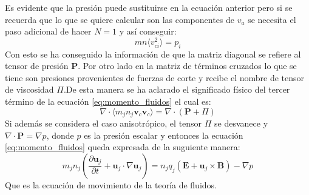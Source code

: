 \documentclass[../tesis_main_file.tex]{subfiles}
\begin{document}
Es evidente que la presión puede sustituirse en la ecuación anterior pero si se recuerda que lo que se quiere calcular son las componentes de $v_a$ se necesita el paso adicional de hacer $N=1$ y así conseguir:
\begin{equation}
mn \langle v_{ci}^2\rangle = p_i
\end{equation} 
Con esto se ha conseguido la información de que la matriz diagonal se refiere al tensor de presión \textbf{P}. Por otro lado en la matriz de términos cruzados lo que se tiene son presiones provenientes de fuerzas de corte \cite{bittencourt2013fundamentals} y recibe el nombre de tensor de viscosidad \textbf{$\Pi$}.De esta manera se ha aclarado el significado físico del tercer término de la ecuación \ref{eq:momento_fluidos} el cual es:
\begin{equation}
\label{eq:tensor_p_vis}
\nabla \cdot \langle m_jn_j \textbf{v}_c \textbf{v}_c \rangle= \nabla \cdot (\textbf{P}+ \Pi)
\end{equation}
Si además se considera el caso anisotrópico, el tensor $\Pi$ se desvanece y $\nabla \cdot \textbf{P}=\nabla p$, donde $p$ es la presión escalar y entonces la ecuación \ref{eq:momento_fluidos} queda expresada de la suguiente manera:
\begin{equation}
\label{eq:movimiento_reducida}
m_jn_j \left( \frac{\partial \textbf{u}_j}{\partial t}+\textbf{u}_j\cdot \nabla \textbf{u}_j \right)= n_jq_j(\textbf{E}+\textbf{u}_j\times \textbf{B})- \nabla p
\end{equation}
Que es la ecuación de movimiento de la teoría de fluidos.
\end{document}
